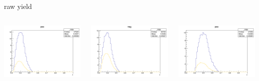 \begin{frame}{raw yield}
\begin{columns}
\begin{column}[T]{0.25\textwidth}
\includegraphics[width = \textwidth]{results/yield/statistics/yield_x_Q2_z_0.60_4.775_0.40_pos.png}
\end{column}
\begin{column}[T]{0.25\textwidth}
\includegraphics[width = \textwidth]{results/yield/statistics/yield_x_Q2_z_0.60_4.775_0.40_neg.png}
\end{column}
\begin{column}[T]{0.25\textwidth}
\includegraphics[width = \textwidth]{results/yield/statistics/yield_x_Q2_z_0.60_4.775_0.50_pos.png}

\end{column}
\end{columns}
\end{frame}
